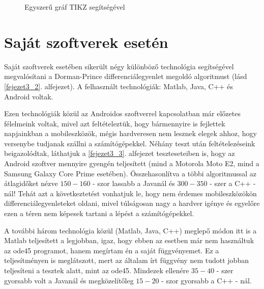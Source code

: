 \begin{figure}
	\centering
\caption{Egyszer\H u gr\'af TIKZ seg\'its\'eg\'evel}
\end{figure}



\newpage
\section {Saját szoftverek esetén}

Saját szoftverek esetében sikerült négy különböző technológia segítségével megvalósítani a Dorman-Prince differenciálegyenlet megoldó algoritmust (lásd \ref{fejezet3_2}. alfejezet). A felhasznált technológiák: Matlab, Java, C++ és Android voltak.

Ezen technológiák közül az Androidos szoftverrel kapcsolatban már előzetes félelmeink voltak, mivel azt feltételeztük, hogy bármennyire is fejlettek napjainkban a mobileszközök, mégis hardveresen nem lesznek elegek ahhoz, hogy versenybe tudjanak szállni a számítógépekkel. Néhány teszt után feltételezéseink beigazolódtak, láthatjuk a \ref{fejezet3_3}. alfejezet teszteseteiben is, hogy az Android szoftver mennyire gyengén teljesített (mind a Motorola Moto E2, mind a Samsung Galaxy Core Prime esetében). Összehasonlítva a többi algoritmussal az átlagidőket nézve $ 150-160 $ - szor lassabb a Javanál és $ 300 - 350 $ - szer a C++ - nál! Tehát azt a következtetést vonhatjuk le, hogy nem érdemes mobileszközökön differenciálegyenleteket oldani, mivel túlságosan nagy a hardver igénye és egyelőre ezen a téren nem képesek tartani a lépést a számítógépekkel.

A további három technológia közül (Matlab, Java, C++) meglepő módon itt is a Matlab teljesített a legjobban, igaz, hogy ebben az esetben már nem használtuk az ode45 programot, hanem megírtam én a saját függvényemet. Ez a teljesítményen is meglátszott, mert az általam írt függvény nem tudott jobban teljesíteni a tesztek alatt, mint az ode45. Mindezek ellenére $ 35-40 $ - szer gyorsabb volt a Javanál és megközelítőleg $ 15-20 $ - szor gyorsabb a C++ - nál.

